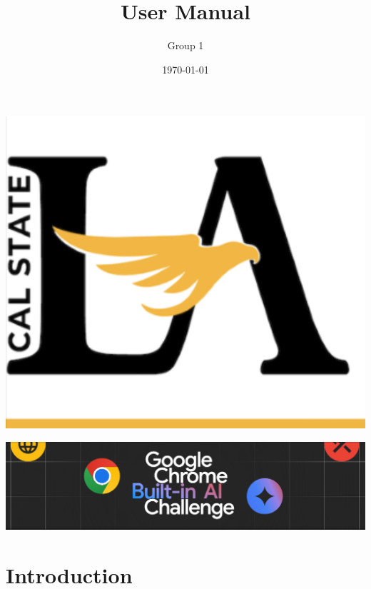 \documentclass{article}
\title{User Manual}
\author{Group 1 }
\date{\today}
\begin{document}
\maketitle  
\pagebreak

\tableofcontents
\pagebreak

\includegraphics[width=0.3\linewidth]{../logo/csula.png} 

\includegraphics[width=0.3\linewidth]{../logo/chromeai.png} 
\section{Introduction}
\end{document}

